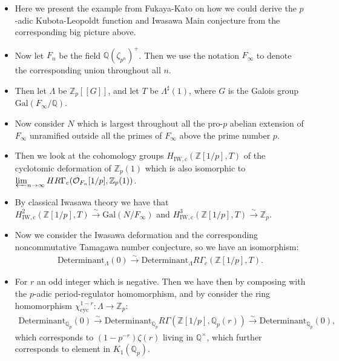 \documentclass[11pt]{report}
\begin{document}

\begin{itemize}
\item<1-> Here we present the example from Fukaya-Kato \cite[Example 2.5]{FK} on how we could derive the $p$-adic Kubota-Leopoldt function and Iwasawa Main conjecture from the corresponding big picture above.
\item<2-> Now let $F_n$ be the field $\mathbb{Q}(\zeta_{p^n})^{+}$. Then we use the notation $F_\infty$ to denote the corresponding union throughout all $n$.
\item<3-> Then let $\Lambda$ be $\mathbb{Z}_p[[G]]$, and let $T$ be $\Lambda^\sharp(1)$, where $G$ is the Galois group $\mathrm{Gal}(F_\infty/\mathbb{Q})$.
\item<4-> Now consider $N$ which is largest throughout all the pro-$p$ abelian extension of $F_\infty$ unramified outside all the primes of $F_\infty$ above the prime number $p$.
\item<5-> Then we look at the cohomology groups $H_\mathrm{IW,c}(\mathbb{Z}[1/p],T)$ of the cyclotomic deformation of $\mathbb{Z}_p(1)$ which is also isomorphic to $\varprojlim_{n\rightarrow \infty} HR\Gamma_{c}(\mathcal{O}_{F_n}[1/p],\mathbb{Z}_p(1))$.
\item<6-> By classical Iwasawa theory we have that $H^2_\mathrm{IW,c}(\mathbb{Z}[1/p],T)\overset{\sim}{\rightarrow} \mathrm{Gal}(N/F_\infty)$ and $H^3_\mathrm{IW,c}(\mathbb{Z}[1/p],T)\overset{\sim}{\rightarrow} \mathbb{Z}_p$.
\item<7-> Now we consider the Iwasawa deformation and the corresponding noncommutative Tamagawa number conjecture, so we have an isomorphism:
\begin{align}
\mathrm{Determinant}_\Lambda(0)\overset{\sim}{\longrightarrow}\mathrm{Determinant}_\Lambda R\Gamma_{c}(\mathbb{Z}[1/p],T).	
\end{align}
\item<8-> For $r$ an odd integer which is negative. Then we have then by composing with the $p$-adic period-regulator homomorphism, and by consider the ring homomorphism $\chi_{\mathrm{cyc}}^{1-r}:\Lambda\rightarrow \mathbb{Z}_p$:
\begin{align}
\mathrm{Determinant}_{\mathbb{Q}_p}(0)\overset{\sim}{\longrightarrow}\mathrm{Determinant}_{\mathbb{Q}_p} R\Gamma(\mathbb{Z}[1/p],\mathbb{Q}_p(r))\overset{\sim}{\rightarrow} \mathrm{Determinant}_{\mathbb{Q}_p}(0),
\end{align}
which corresponds to $(1-p^{-r})\zeta(r)$ living in $\mathbb{Q}^\times$, which further corresponds to element in $K_1(\mathbb{Q}_p)$.
\end{itemize}
\end{document}
